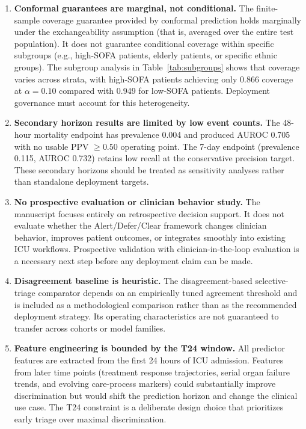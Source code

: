 \begin{enumerate}
\item \textbf{Conformal guarantees are marginal, not conditional.} The finite-sample coverage guarantee provided by conformal prediction holds marginally under the exchangeability assumption (that is, averaged over the entire test population).\cite{Vovk2005} It does not guarantee conditional coverage within specific subgroups (e.g., high-SOFA patients, elderly patients, or specific ethnic groups). The subgroup analysis in Table~\ref{tab:subgroups} shows that coverage varies across strata, with high-SOFA patients achieving only 0.866 coverage at $\alpha = 0.10$ compared with 0.949 for low-SOFA patients. Deployment governance must account for this heterogeneity.

\item \textbf{Secondary horizon results are limited by low event counts.} The 48-hour mortality endpoint has prevalence 0.004 and produced AUROC 0.705 with no usable PPV $\geq 0.50$ operating point. The 7-day endpoint (prevalence 0.115, AUROC 0.732) retains low recall at the conservative precision target. These secondary horizons should be treated as sensitivity analyses rather than standalone deployment targets.

\item \textbf{No prospective evaluation or clinician behavior study.} The manuscript focuses entirely on retrospective decision support. It does not evaluate whether the Alert/Defer/Clear framework changes clinician behavior, improves patient outcomes, or integrates smoothly into existing ICU workflows. Prospective validation with clinician-in-the-loop evaluation is a necessary next step before any deployment claim can be made.

\item \textbf{Disagreement baseline is heuristic.} The disagreement-based selective-triage comparator depends on an empirically tuned agreement threshold and is included as a methodological comparison rather than as the recommended deployment strategy. Its operating characteristics are not guaranteed to transfer across cohorts or model families.

\item \textbf{Feature engineering is bounded by the T24 window.} All predictor features are extracted from the first 24 hours of ICU admission. Features from later time points (treatment response trajectories, serial organ failure trends, and evolving care-process markers) could substantially improve discrimination but would shift the prediction horizon and change the clinical use case. The T24 constraint is a deliberate design choice that prioritizes early triage over maximal discrimination.


\end{enumerate}
